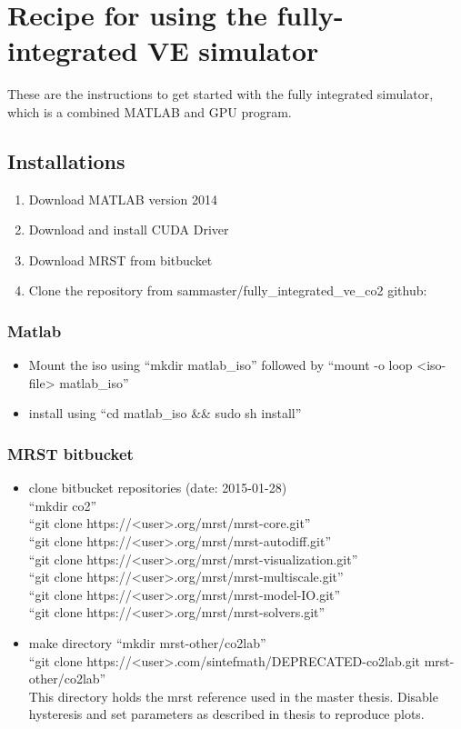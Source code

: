 \documentclass[a4paper, 11pt,utf8]{report}
\begin{document}
\chapter*{Recipe for using the fully-integrated VE simulator}
These are the instructions to get started with the fully integrated simulator, which is a combined MATLAB and GPU program. \section*{Installations}
\begin{enumerate}
\item{Download MATLAB version 2014}
\item{Download and install CUDA Driver}
\item{Download MRST from bitbucket}
\item{Clone the repository from sammaster/fully\_integrated\_ve\_co2 github:}
\end{enumerate}

\subsection{Matlab}
\begin{itemize}
\item Mount the iso using ``mkdir matlab\_iso'' followed by ``mount -o loop <iso-file> matlab\_iso''
\item install using ``cd matlab\_iso \&\& sudo sh install''
\end{itemize}

\subsection{MRST bitbucket}
\begin{itemize}
\item clone bitbucket repositories (date: 2015-01-28)\\
``mkdir co2''\\
``git clone https://<user>\@bitbucket.org/mrst/mrst-core.git''\\
``git clone https://<user>\@bitbucket.org/mrst/mrst-autodiff.git''\\
``git clone https://<user>\@bitbucket.org/mrst/mrst-visualization.git''\\
``git clone https://<user>\@bitbucket.org/mrst/mrst-multiscale.git''\\
``git clone https://<user>\@bitbucket.org/mrst/mrst-model-IO.git''\\
``git clone https://<user>\@bitbucket.org/mrst/mrst-solvers.git''
\item make directory ``mkdir mrst-other/co2lab''\\
``git clone https://<user>\@github.com/sintefmath/DEPRECATED-co2lab.git mrst-other/co2lab''\\
This directory holds the mrst reference used in the master thesis. Disable hysteresis and set parameters as described in thesis to reproduce plots.
\end{itemize}
\end{document}

